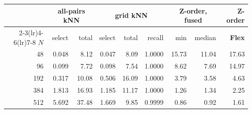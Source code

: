 \begin{tabular}{r rr rrr rr r}
\toprule
& \multicolumn{2}{c}{\textbf{all-pairs kNN}} & \multicolumn{3}{c}{\textbf{grid kNN}} & \multicolumn{2}{c}{\textbf{Z-order, fused}} & \textbf{Z-order} \\
\cmidrule(lr){2-3}\cmidrule(lr){4-6}\cmidrule(lr){7-8}
$N$ & select & total & select & total & recall & min & median & \textbf{Flex} \\
\midrule
48 & 0.048 & 8.12 & 0.047 & 8.09 & 1.0000 & 15.73 & 11.04 & 17.63 \\
96 & 0.099 & 7.72 & 0.098 & 7.54 & 1.0000 & 8.62 & 7.69 & 14.97 \\
192 & 0.317 & 10.08 & 0.506 & 16.09 & 1.0000 & 3.79 & 3.58 & 4.63 \\
384 & 1.813 & 16.93 & 1.185 & 11.17 & 1.0000 & 1.26 & 1.34 & 2.25 \\
512 & 5.692 & 37.48 & 1.669 & 9.85 & 0.9999 & 0.86 & 0.92 & 1.61 \\
\bottomrule
\end{tabular}%
